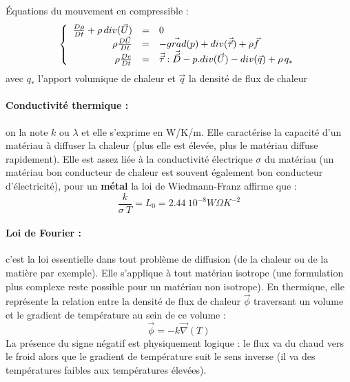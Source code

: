 
Équations du mouvement en compressible :
\[
\left\{
\begin{array}{r c l}
\frac{D\rho}{Dt}+\rho\,div(\vec{U}) &=& 0 \\
\rho\frac{D\vec{U}}{Dt} &=& -\vec{grad}(p)+div(\vec{\vec{\tau}})+\rho\vec{f} \\
\rho\frac{De}{Dt} &=& \vec{\vec{\tau}}:\vec{\vec{D}}-p.div(\vec{U})-div(\vec{q})+\rho\,q_*
\end{array}
\right.
\]
avec $q_*$ l'apport volumique de chaleur et $\vec{q}$ la densité de flux de chaleur


\paragraph{Conductivité thermique :}on la note $k$ ou $\lambda$ et elle s'exprime en W/K/m. Elle caractérise la capacité d'un matériau à diffuser la chaleur (plus elle est élevée, plus le matériau diffuse rapidement). Elle est assez liée à la conductivité électrique $\sigma$ du matériau (un matériau bon conducteur de chaleur est souvent également bon conducteur d'électricité), pour un \textbf{métal} la loi de Wiedmann-Franz\cite{battaglia2010introduction} affirme que :
%
\begin{equation}
\frac{k}{\sigma~T} = L_0 = 2.44~10^{-8} W\Omega K^{-2}
\end{equation}


\paragraph{Loi de Fourier :}c'est la loi essentielle dans tout problème de diffusion (de la chaleur ou de la matière par exemple). Elle s'applique à tout matériau isotrope (une formulation plus complexe reste possible pour un matériau non isotrope). En thermique, elle représente la relation entre la densité de flux de chaleur $\vec{\phi}$ traversant un volume et le gradient de température au sein de ce volume :
%
\begin{equation}
\vec{\phi} = - k \vec{\nabla}(T)
\end{equation}
%
La présence du signe négatif est physiquement logique : le flux va du chaud vers le froid alors que le gradient de température suit le sens inverse (il va des températures faibles aux températures élevées).
%
\begin{center}
\end{center}


